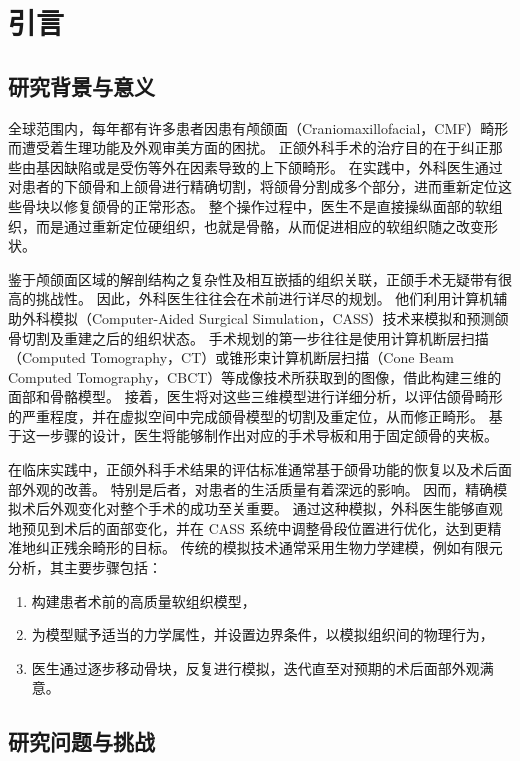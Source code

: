 \chapter{引言}

\section{研究背景与意义}

全球范围内，每年都有许多患者因患有颅颌面（Craniomaxillofacial，CMF）畸形而遭受着生理功能及外观审美方面的困扰。
正颌外科手术的治疗目的在于纠正那些由基因缺陷或是受伤等外在因素导致的上下颌畸形。
在实践中，外科医生通过对患者的下颌骨和上颌骨进行精确切割，将颌骨分割成多个部分，进而重新定位这些骨块以修复颌骨的正常形态。
整个操作过程中，医生不是直接操纵面部的软组织，而是通过重新定位硬组织，也就是骨骼，从而促进相应的软组织随之改变形状。

鉴于颅颌面区域的解剖结构之复杂性及相互嵌插的组织关联，正颌手术无疑带有很高的挑战性。
因此，外科医生往往会在术前进行详尽的规划。
他们利用计算机辅助外科模拟（Computer-Aided Surgical Simulation，CASS）技术来模拟和预测颌骨切割及重建之后的组织状态。
手术规划的第一步往往是使用计算机断层扫描（Computed Tomography，CT）或锥形束计算机断层扫描（Cone Beam Computed Tomography，CBCT）等成像技术所获取到的图像，借此构建三维的面部和骨骼模型。
接着，医生将对这些三维模型进行详细分析，以评估颌骨畸形的严重程度，并在虚拟空间中完成颌骨模型的切割及重定位，从而修正畸形。
基于这一步骤的设计，医生将能够制作出对应的手术导板和用于固定颌骨的夹板。

在临床实践中，正颌外科手术结果的评估标准通常基于颌骨功能的恢复以及术后面部外观的改善。
特别是后者，对患者的生活质量有着深远的影响。
因而，精确模拟术后外观变化对整个手术的成功至关重要。
通过这种模拟，外科医生能够直观地预见到术后的面部变化，并在 CASS 系统中调整骨段位置进行优化，达到更精准地纠正残余畸形的目标。
传统的模拟技术通常采用生物力学建模，例如有限元分析，其主要步骤包括：
\begin{enumerate}
  \item 构建患者术前的高质量软组织模型，
  \item 为模型赋予适当的力学属性，并设置边界条件，以模拟组织间的物理行为，
  \item 医生通过逐步移动骨块，反复进行模拟，迭代直至对预期的术后面部外观满意。
\end{enumerate}

\section{研究问题与挑战}

